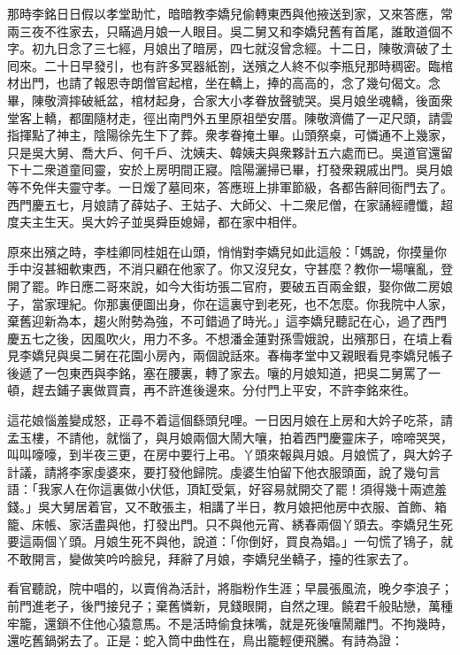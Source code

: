那時李銘日日假以孝堂助忙，暗暗教李嬌兒偷轉東西與他掖送到家，又來答應，常兩三夜不徃家去，只瞞過月娘一人眼目。吳二舅又和李嬌兒舊有首尾，誰敢道個不字。初九日念了三七經，月娘出了暗房，四七就沒曾念經。十二日，陳敬濟破了土囘來。二十日早發引，也有許多冥器紙劄，送殯之人終不似李瓶兒那時稠密。臨棺材出門，也請了報恩寺朗僧官起棺，坐在轎上，捧的高高的，念了幾句偈文。念畢，陳敬濟摔破紙盆，棺材起身，合家大小孝眷放聲號哭。吳月娘坐魂轎，後面衆堂客上轎，都圍隨材走，徑出南門外五里原祖塋安厝。陳敬濟備了一疋尺頭，請雲指揮點了神主，陰陽徐先生下了葬。衆孝眷掩土畢。山頭祭桌，可憐通不上幾家，只是吳大舅、喬大戶、何千戶、沈姨夫、韓姨夫與衆夥計五六處而已。吳道官還留下十二衆道童囘靈，安於上房明間正寢。陰陽灑掃已畢，打發衆親戚出門。吳月娘等不免伴夫靈守孝。一日煖了墓囘來，答應班上排軍節級，各都告辭囘衙門去了。西門慶五七，月娘請了薛姑子、王姑子、大師父、十二衆尼僧，在家誦經禮懺，超度夫主生天。吳大妗子並吳舜臣媳婦，都在家中相伴。

原來出殯之時，李桂卿同桂姐在山頭，悄悄對李嬌兒如此這般：「媽說，你摸量你手中沒甚細軟東西，不消只顧在他家了。你又沒兒女，守甚麼？教你一場嚷亂，登開了罷。{}昨日應二哥來說，如今大街坊張二官府，要破五百兩金銀，娶你做二房娘子，當家理紀。你那裏便圖出身，你在這裏守到老死，也不怎麼。你我院中人家，棄舊迎新為本，趨火附勢為強，不可錯過了時光。」這李嬌兒聽記在心，過了西門慶五七之後，因風吹火，用力不多。不想潘金蓮對孫雪娥說，出殯那日，在墳上看見李嬌兒與吳二舅在花園小房內，兩個說話來。春梅孝堂中又親眼看見李嬌兒帳子後遞了一包東西與李銘，塞在腰裏，轉了家去。{}嚷的月娘知道，把吳二舅罵了一頓，趕去鋪子裏做買賣，再不許進後邊來。分付門上平安，不許李銘來徃。

這花娘惱羞變成怒，正尋不着這個繇頭兒哩。一日因月娘在上房和大妗子吃茶，請孟玉樓，不請他，就惱了，與月娘兩個大鬧大嚷，拍着西門慶靈床子，啼啼哭哭，叫叫嚎嚎，到半夜三更，在房中要行上弔。丫頭來報與月娘。月娘慌了，與大妗子計議，請將李家虔婆來，要打發他歸院。虔婆生怕留下他衣服頭面，說了幾句言語：「我家人在你這裏做小伏低，頂缸受氣，好容易就開交了罷！須得幾十兩遮羞錢。」{}吳大舅居着官，又不敢張主，相講了半日，教月娘把他房中衣服、首飾、箱籠、床帳、家活盡與他，打發出門。只不與他元宵、綉春兩個丫頭去。李嬌兒生死要這兩個丫頭。月娘生死不與他，說道：「你倒好，買良為娼。」一句慌了鴇子，就不敢開言，變做笑吟吟臉兒，拜辭了月娘，李嬌兒坐轎子，擡的徃家去了。

看官聽說，院中唱的，以賣俏為活計，將脂粉作生涯；早晨張風流，晚夕李浪子；前門進老子，後門接兒子；棄舊憐新，見錢眼開，自然之理。饒君千般貼戀，萬種牢籠，還鎖不住他心猿意馬。不是活時偷食抹嘴，就是死後嚷鬧離門。不拘幾時，還吃舊鍋粥去了。正是：蛇入筒中曲性在，鳥出籠輕便飛騰。有詩為證：


